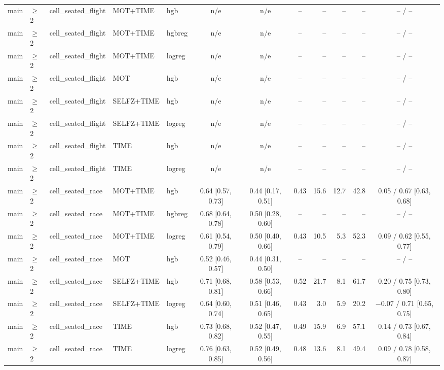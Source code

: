 \begin{longtable}{@{}lllllcccrrrc@{}}
main & $\geq$2 & cell\_seated\_flight & MOT+TIME & hgb & n/e & n/e & -- & -- & -- & -- & -- / -- \\
main & $\geq$2 & cell\_seated\_flight & MOT+TIME & hgbreg & n/e & n/e & -- & -- & -- & -- & -- / -- \\
main & $\geq$2 & cell\_seated\_flight & MOT+TIME & logreg & n/e & n/e & -- & -- & -- & -- & -- / -- \\
main & $\geq$2 & cell\_seated\_flight & MOT & hgb & n/e & n/e & -- & -- & -- & -- & -- / -- \\
main & $\geq$2 & cell\_seated\_flight & SELFZ+TIME & hgb & n/e & n/e & -- & -- & -- & -- & -- / -- \\
main & $\geq$2 & cell\_seated\_flight & SELFZ+TIME & logreg & n/e & n/e & -- & -- & -- & -- & -- / -- \\
main & $\geq$2 & cell\_seated\_flight & TIME & hgb & n/e & n/e & -- & -- & -- & -- & -- / -- \\
main & $\geq$2 & cell\_seated\_flight & TIME & logreg & n/e & n/e & -- & -- & -- & -- & -- / -- \\
main & $\geq$2 & cell\_seated\_race & MOT+TIME & hgb & 0.64 [0.57, 0.73] & 0.44 [0.17, 0.51] & 0.43 & 15.6 & 12.7 & 42.8 & 0.05 / 0.67 [0.63, 0.68] \\
main & $\geq$2 & cell\_seated\_race & MOT+TIME & hgbreg & 0.68 [0.64, 0.78] & 0.50 [0.28, 0.60] & -- & -- & -- & -- & -- / -- \\
main & $\geq$2 & cell\_seated\_race & MOT+TIME & logreg & 0.61 [0.54, 0.79] & 0.50 [0.40, 0.66] & 0.43 & 10.5 & 5.3 & 52.3 & 0.09 / 0.62 [0.55, 0.77] \\
main & $\geq$2 & cell\_seated\_race & MOT & hgb & 0.52 [0.46, 0.57] & 0.44 [0.31, 0.50] & -- & -- & -- & -- & -- / -- \\
main & $\geq$2 & cell\_seated\_race & SELFZ+TIME & hgb & 0.71 [0.68, 0.81] & 0.58 [0.53, 0.66] & 0.52 & 21.7 & 8.1 & 61.7 & 0.20 / 0.75 [0.73, 0.80] \\
main & $\geq$2 & cell\_seated\_race & SELFZ+TIME & logreg & 0.64 [0.60, 0.74] & 0.51 [0.46, 0.65] & 0.43 & 3.0 & 5.9 & 20.2 & $-$0.07 / 0.71 [0.65, 0.75] \\
main & $\geq$2 & cell\_seated\_race & TIME & hgb & 0.73 [0.68, 0.82] & 0.52 [0.47, 0.55] & 0.49 & 15.9 & 6.9 & 57.1 & 0.14 / 0.73 [0.67, 0.84] \\
main & $\geq$2 & cell\_seated\_race & TIME & logreg & 0.76 [0.63, 0.85] & 0.52 [0.49, 0.56] & 0.48 & 13.6 & 8.1 & 49.4 & 0.09 / 0.78 [0.58, 0.87] \\

\end{longtable}
